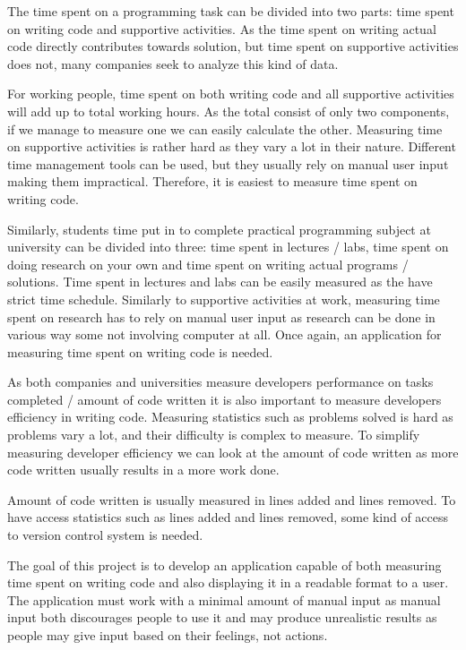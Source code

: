 The time spent on a programming task can be divided into two parts: time spent on writing code and supportive activities.
As the time spent on writing actual code directly contributes towards solution, but time spent on supportive activities does not,
many companies seek to analyze this kind of data.

For working people, time spent on both writing code and all supportive activities will add up to total working hours.
As the total consist of only two components, if we manage to measure one we can easily calculate the other.
Measuring time on supportive activities is rather hard as they vary a lot in their nature.
Different time management tools can be used, but they usually rely on manual user input making them impractical.
Therefore, it is easiest to measure time spent on writing code.

Similarly, students time put in to complete practical programming subject at university can be divided into three: time spent in lectures / labs,
time spent on doing research on your own and time spent on writing actual programs / solutions.
Time spent in lectures and labs can be easily measured as the have strict time schedule.
Similarly to supportive activities at work, measuring time spent on research has to rely on manual user input as research can be done in various way some not involving computer at all.
Once again, an application for measuring time spent on writing code is needed.

As both companies and universities measure developers performance on tasks completed / amount of code written it is also important to measure
developers efficiency in writing code.
Measuring statistics such as problems solved is hard as problems vary a lot, and their difficulty is complex to measure.
To simplify measuring developer efficiency we can look at the amount of code written as more code written usually results in a more work done.

Amount of code written is usually measured in lines added and lines removed.
To have access statistics such as lines added and lines removed, some kind of access to version control system is needed.

The goal of this project is to develop an application capable of both measuring time spent on writing code and also
displaying it in a readable format to a user.
The application must work with a minimal amount of manual input as manual input both discourages people to use it and may produce
unrealistic results as people may give input based on their feelings, not actions.


